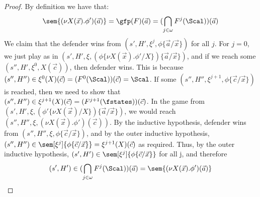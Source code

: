 \begin{proof}
	By definition we have that:
	\[
		\sem{(\nu X(\vec x).\phi')(\vec a)} = \gfp(F)(\vec a) = (\bigcap_{j \in \omega} F^j(\Scal))(\vec a)
	\]
	We claim that the defender wins from $(s', H', \xi^j,\phi\{\vec a / \vec x\})$ for all $j$. 
	For $j = 0$, we just play as in $(s', H', \xi, (\phi\{\nu X(\vec x).\phi' / X\})\{\vec a / \vec x\})$, and if we reach some $(s'', H', \xi^0, X(\vec c))$, then defender wins. 
	This is because $(s'', H'') \in \xi^0(X)(\vec c) = (F^0(\Scal))(\vec c) = \Scal$. 
	If some $(s'', H'', \xi^{j + 1}, \phi\{\vec c / \vec x\})$ is reached, then we need to show that $(s'', H'')\in \xi^{j+1}(X)(\vec c) = (F^{j + 1}(\fstates))(\vec c)$. 
	In the game from $(s', H', \xi, (\phi'\{\nu X(\vec x) / X\})\{\vec a / \vec x\})$, we would reach $(s'', H'', \xi, (\nu X(\vec x).\phi')(\vec c))$. 
	By the inductive hypothesis, defender wins from $(s'', H'',\xi, \phi\{\vec c / \vec x\})$, and by the outer inductive hypothesis, $(s'', H'')\in \sem[\xi^j]{\phi\{\vec c / \vec x\}} = \xi^{j + 1}(X)(\vec c)$ as required.
	Thus, by the outer inductive hypothesis, $(s', H')\in \sem[\xi^j]{\phi\{\vec c / \vec x\}}$ for all j, and therefore 
	\[
	(s', H')\in (\bigcap_{j \in \omega}F^j(\Scal))(\vec a) = \sem{(\nu X(\vec x).\phi')(\vec a)}
	\]
\end{proof}

%

